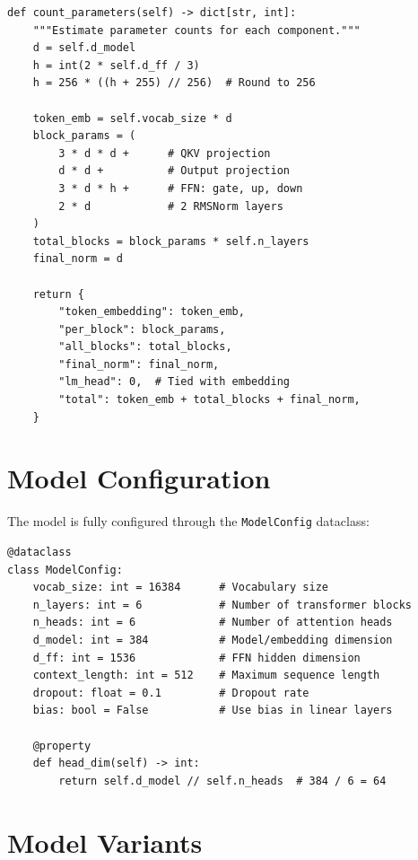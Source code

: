 \begin{lstlisting}[style=python, caption={Parameter counting from config.py}]
def count_parameters(self) -> dict[str, int]:
    """Estimate parameter counts for each component."""
    d = self.d_model
    h = int(2 * self.d_ff / 3)
    h = 256 * ((h + 255) // 256)  # Round to 256

    token_emb = self.vocab_size * d
    block_params = (
        3 * d * d +      # QKV projection
        d * d +          # Output projection
        3 * d * h +      # FFN: gate, up, down
        2 * d            # 2 RMSNorm layers
    )
    total_blocks = block_params * self.n_layers
    final_norm = d

    return {
        "token_embedding": token_emb,
        "per_block": block_params,
        "all_blocks": total_blocks,
        "final_norm": final_norm,
        "lm_head": 0,  # Tied with embedding
        "total": token_emb + total_blocks + final_norm,
    }
\end{lstlisting}

\section{Model Configuration}

The model is fully configured through the \texttt{ModelConfig} dataclass:

\begin{lstlisting}[style=python, caption={ModelConfig from config.py}]
@dataclass
class ModelConfig:
    vocab_size: int = 16384      # Vocabulary size
    n_layers: int = 6            # Number of transformer blocks
    n_heads: int = 6             # Number of attention heads
    d_model: int = 384           # Model/embedding dimension
    d_ff: int = 1536             # FFN hidden dimension
    context_length: int = 512    # Maximum sequence length
    dropout: float = 0.1         # Dropout rate
    bias: bool = False           # Use bias in linear layers

    @property
    def head_dim(self) -> int:
        return self.d_model // self.n_heads  # 384 / 6 = 64
\end{lstlisting}

\section{Model Variants}

